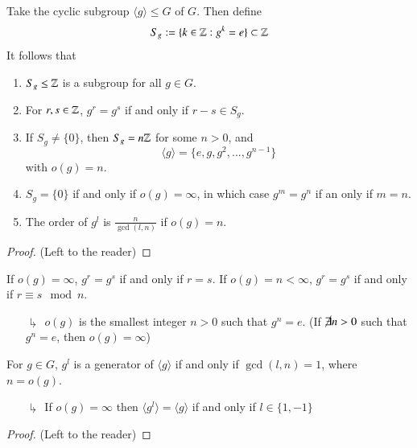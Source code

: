 \documentclass[12pt, a4paper, oneside, openright, titlepage]{book}
\begin{document}
\begin{prop}
    Take the cyclic subgroup $\langle g \rangle \leq G$ of $G$. Then define \begin{equation}
        S_g := \{k \in \mathbb Z: g^k = e\}\subset \mathbb Z
    \end{equation}
    It follows that \begin{enumerate}
        \item $S_g \leq \mathbb Z$ is a subgroup for all $g \in G$.
        \item For $r,s \in \mathbb Z$, $g^r = g^s$ if and only if $r-s \in S_g$.
        \item If $S_g \neq \{0\}$, then $S_g = n\mathbb Z$ for some $n >0$, and \begin{equation}
            \langle g \rangle = \{e,g,g^2,...,g^{n-1}\}
        \end{equation}
        with $o(g) =n$.
        \item $S_g = \{0\}$ if and only if $o(g) = \infty$, in which case $g^m = g^n$ if an only if $m = n$.
        \item The order of $g^l$ is $\frac{n}{\gcd(l,n)}$ if $o(g) = n$.
    \end{enumerate}
\end{prop}
\begin{proof}
    (Left to the reader)
\end{proof}

\begin{rmk}
    If $o(g) = \infty$, $g^r = g^s$ if and only if $r = s$. If $o(g) = n < \infty$, $g^r = g^s$ if and only if $r \equiv s \mod n$.
    \begin{enumerate}
        \item[$\drsh$] $o(g)$ is the smallest integer $n > 0$ such that $g^n = e$. (If $\cancel{\exists}n > 0$ such that $g^n = e$, then $o(g) = \infty$) 
    \end{enumerate}
\end{rmk}

\begin{cor}
    For $g \in G$, $g^l$ is a generator of $\langle g \rangle$ if and only if $\gcd(l,n) = 1$, where $n = o(g)$.
\end{cor}
\begin{enumerate}
    \item[$\drsh$] If $o(g) = \infty$ then $\langle g^l \rangle = \langle g \rangle$ if and only if $l \in \{1,-1\}$
\end{enumerate}
\begin{proof}
    (Left to the reader)
\end{proof}
\end{document}
